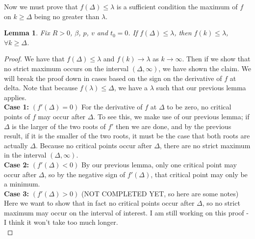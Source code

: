 \documentclass{article}
\newtheorem{lemma}{Lemma}[section]
\begin{document}
Now we must prove that $f(\Delta) \leq \lambda$ is a sufficient condition the maximum of $f$ on $k\geq \Delta$ being no greater than $\lambda$.

\begin{lemma}
Fix $R > 0$, $\beta$, $p$, $v$ and $t_0 = 0$. If $f(\Delta) \leq \lambda$, then $f(k) \leq \lambda$, $\forall k \geq \Delta$. 
\end{lemma}

\begin{proof}
We have that $f(\Delta) \leq \lambda$ and $f(k) \rightarrow \lambda$ as $k \rightarrow \infty$. Then if we show that no strict maximum occurs on the interval $(\Delta, \infty)$, we have shown the claim. We will break the proof down in cases based on the sign on the derivative of $f$ at delta. Note that because $f(\lambda) \leq \Delta$, we have a $\lambda$ such that our previous lemma applies. \\

\textbf{Case 1:} $(f'(\Delta) = 0)$ For the derivative of $f$ at $\Delta$ to be zero, no critical points of $f$ may occur after $\Delta$. To see this, we make use of our previous lemma; if $\Delta$ is the larger of the two roots of $f'$ then we are done, and by the previous result, if it is the smaller of the two roots, it must be the case that both roots are actually $\Delta$. Because no critical points occur after $\Delta$, there are no strict maximum in the interval $(\Delta, \infty)$. \\

\textbf{Case 2:} $(f'(\Delta) < 0)$ By our previous lemma, only one critical point may occur after $\Delta$, so by the negative sign of $f'(\Delta)$, that critical point may only be a minimum. \\

\textbf{Case 3:} $(f'(\Delta) > 0)$ (NOT COMPLETED YET, so here are some notes) Here we want to show that in fact no critical points occur after $\Delta$, so no strict maximum may occur on the interval of interest. I am still working on this proof - I think it won't take too much longer. \\


\end{proof}
\end{document}
